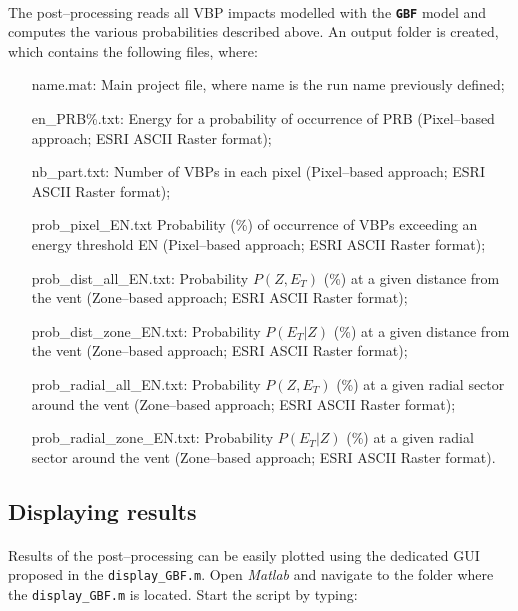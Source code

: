 \documentclass[10pt,a4paper]{article}
\begin{document}
\paragraph{} The post--processing reads all VBP impacts modelled with the \textbf{\texttt{\textsf{\color{namecolor}GBF}}} model and computes the various probabilities described above. An output folder is created, which contains the following files, where:

\begin{itemize}[leftmargin=4cm,labelindent=16pt, itemsep=0.25pt]
	\item[\textsf{\color{namecolor}name.mat:}] Main project file, where \textsf{\color{namecolor}name} is the run name previously defined;
	\item[\textsf{\color{namecolor}en\_PRB\%.txt:}] Energy for a probability of occurrence of PRB (Pixel--based approach; ESRI ASCII Raster format);
	\item[\textsf{\color{namecolor}nb\_part.txt:}] Number of VBPs in each pixel (Pixel--based approach; ESRI ASCII Raster format);
	\item[\textsf{\color{namecolor}prob\_pixel\_EN.txt}] Probability (\%) of occurrence of VBPs exceeding an energy threshold EN (Pixel--based approach; ESRI ASCII Raster format);
	\item[\textsf{\color{namecolor}prob\_dist\_all\_EN.txt:}] Probability $P(Z, E_T)$ (\%) at a given distance from the vent (Zone--based approach; ESRI ASCII Raster format);
	\item[\textsf{\color{namecolor}prob\_dist\_zone\_EN.txt:}] Probability $P(E_T \vert Z)$ (\%) at a given distance from the vent (Zone--based approach; ESRI ASCII Raster format);
	\item[\textsf{\color{namecolor}prob\_radial\_all\_EN.txt:}] Probability $P(Z, E_T)$ (\%) at a given radial sector around the vent (Zone--based approach; ESRI ASCII Raster format);
	\item[\textsf{\color{namecolor}prob\_radial\_zone\_EN.txt:}] Probability $P(E_T \vert Z)$ (\%) at a given radial sector around the vent (Zone--based approach; ESRI ASCII Raster format).
\end{itemize}


\subsection{Displaying results}
\paragraph{} Results of the post--processing can be easily plotted using the dedicated GUI proposed in the \texttt{display\_GBF.m}. Open \textit{Matlab} and navigate to the folder where the \texttt{display\_GBF.m} is located. Start the script by typing:
\end{document}
